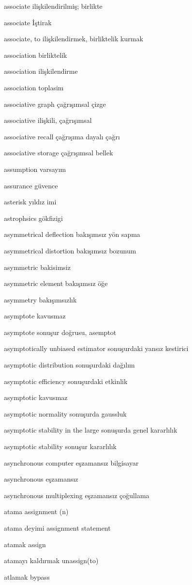\documentclass[12pt,fleqn]{article}\usepackage{../../common}
\begin{document}
associate ilişkilendirilmiş; birlikte

associate İştirak

associate, to ilişkilendirmek, birliktelik kurmak

association birliktelik

association ilişkilendirme

association toplasim

associative graph çağrışımsal çizge

associative ilişkili, çağrışımsal

associative recall çağrışıma dayalı çağrı

associative storage çağrışımsal bellek

assumption varsayım

assurance güvence

asterisk yıldız imi

astrophsics gökfizigi

asymmetrical deflection bakışımsız yön sapma

asymmetrical distortion bakışımsız bozunum

asymmetric bakisimsiz

asymmetric element bakışımsız öğe

asymmetry bakışımsızlık

asymptote kavusmaz

asymptote sonuşur doğrusu, asemptot

asymptotically unbiased estimator sonuşurdaki yansız kestirici

asymptotic distribution sonuşurdaki dağılım

asymptotic efficiency sonuşurdaki etkinlik

asymptotic kavusmaz

asymptotic normality sonuşurda gaussluk

asymptotic stability in the large sonuşurda genel kararlılık

asymptotic stability sonuşur kararlılık

asynchronous computer eşzamansız bilgisayar

asynchronous eşzamansız

asynchronous multiplexing eşzamansız çoğullama

atama assignment (n)

atama deyimi assignment statement

atamak assign

atamayı kaldırmak unassign(to)

atlamak bypass
\end{document}
